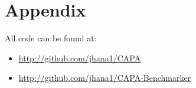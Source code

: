 \section{Appendix}
All code can be found at:
\begin{itemize}
    \item\url{http://github.com/jhana1/CAPA}
    \item\url{http://github.com/jhana1/CAPA-Benchmarker}
\end{itemize}



